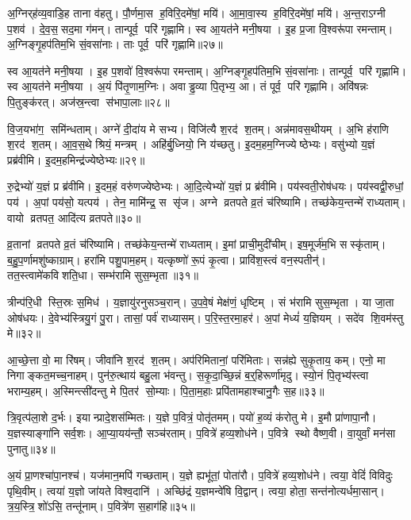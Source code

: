 अ॒ग्निर्‌ह॑व्य॒वाडि॒ह ताना व॑हतु।
पौ॒र्णमा॒स ह॒विरि॒दमे॑षां॒ मयि॑।
आ॒मा॒वा॒स्य ह॒विरि॒दमे॑षां॒ मयि॑।
अ॒न्त॒राऽग्नी प॒शव॑।
दे॒व॒स॒सद॒मा ग॑मन्।
तान्पूर्व॒ परि॑ गृह्णामि।
स्व आ॒यत॑ने मनी॒षया।
इ॒ह प्र॒जा वि॒श्वरू॑पा रमन्ताम्।
अ॒ग्निङ्गृ॒हप॑तिम॒भि सं॒वसा॑नाः।
ताः पूर्व॒ परि॑ गृह्णामि॥२७॥

स्व आ॒यत॑ने मनी॒षया।
इ॒ह प॒शवो॑ वि॒श्वरू॑पा रमन्ताम्।
अ॒ग्निङ्गृ॒हप॑तिम॒भि सं॒वसा॑नाः।
तान्पूर्व॒ परि॑ गृह्णामि।
स्व आ॒यत॑ने मनी॒षया।
अ॒यं पि॑तृ॒णाम॒ग्निः।
अवाड्ढ॒व्या पि॒तृभ्य॒ आ।
तं पूर्व॒ परि॑ गृह्णामि।
अवि॑षन्नः पि॒तुङ्क॑रत्।
अज॑स्र॒न्त्वा स॑भापा॒लाः॥२८॥

वि॒ज॒यभा॑ग॒ समि॑न्धताम्।
अग्ने॑ दी॒दा॑य मे सभ्य।
विजि॑त्यै श॒रद॑ श॒तम्।
अन्न॑मावस॒थीयम्।
अ॒भि ह॑राणि श॒रद॑ श॒तम्।
आ॒व॒स॒थे श्रियं॒ मन्त्रम्।
अहि॑र्बु॒ध्नियो॒ नि य॑च्छतु।
इ॒दम॒हम॒ग्निज्येष्ठेभ्यः।
वसु॑भ्यो य॒ज्ञं प्रब्र॑वीमि।
इ॒दम॒हमिन्द्र॑ज्येष्ठेभ्यः॥२९॥

रु॒द्रेभ्यो॑ य॒ज्ञं प्र ब्र॑वीमि।
इ॒दम॒हं वरु॑णज्येष्ठेभ्यः।
आ॒दि॒त्येभ्यो॑ य॒ज्ञं प्र ब्र॑वीमि।
पय॑स्वती॒रोष॑धयः।
पय॑स्वद्वी॒रुधां॒ पय॑।
अ॒पां पय॑सो॒ यत्पय॑।
तेन॒ मामि॑न्द्र॒ स सृ॑ज।
अग्ने व्रतपते व्र॒तं च॑रिष्यामि।
तच्छ॑केय॒न्तन्मे॑ राध्यताम्।
वायो व्रतपत॒ आदि॑त्य व्रतपते॥३०॥

व्र॒तानां व्रतपते व्र॒तं च॑रिष्यामि।
तच्छ॑केय॒न्तन्मे॑ राध्यताम्।
इ॒मां प्राची॒मुदी॑चीम्।
इष॒मूर्ज॑म॒भि सस्कृ॑ताम्।
ब॒हु॒प॒र्णामशु॑ष्काग्राम्।
हरा॑मि पशु॒पाम॒हम्।
यत्कृष्णो॑ रू॒पं कृ॒त्वा।
प्रावि॑श॒स्त्वं वन॒स्पतीन्॑।
तत॒स्त्वामे॑कविशति॒धा।
सम्भ॑रामि सुस॒म्भृता॥३१॥

त्रीन्प॑रि॒धी स्ति॒स्रः स॒मिध॑।
य॒ज्ञायु॑रनुसञ्च॒रान्।
उ॒प॒वे॒षं मेक्ष॑णं॒ धृष्टिम्।
सं भ॑रामि सुस॒म्भृता।
या जा॒ता ओष॑धयः।
दे॒वेभ्य॑स्त्रियु॒गं पु॒रा।
तासां॒ पर्व॑ राध्यासम्।
प॒रि॒स्त॒रमा॒हर\sn{}॑।
अ॒पां मेध्यं॑ य॒ज्ञियम्।
सदे॑व शि॒वम॑स्तु मे॥३२॥

आ॒च्छे॒त्ता वो॒ मा रि॑षम्।
जीवा॑नि श॒रद॑ श॒तम्।
अप॑रिमितानां॒ परि॑मिताः।
सन्न॑ह्ये सुकृ॒ताय॒ कम्।
एनो॒ मा निगाङ्कत॒मच्च॒नाहम्।
पुन॑रु॒त्थाय॑ बहु॒ला भ॑वन्तु।
स॒कृ॒दा॒च्छि॒न्नं ब॒र्॒हिरूर्णा॑मृदु।
स्यो॒नं पि॒तृभ्य॑स्त्वा भराम्य॒हम्।
अ॒स्मिन्त्सी॑दन्तु मे पि॒तर॑ सो॒म्याः।
पि॒ता॒म॒हाः प्रपि॑तामहाश्चानु॒गैः स॒ह॥३३॥

त्रि॒वृत्प॑ला॒शे द॒र्भः।
इयान्प्रादे॒शस॑म्मितः।
य॒ज्ञे प॒वित्रं॒ पोतृ॑तमम्।
पयो॑ ह॒व्यं क॑रोतु मे।
इ॒मौ प्रा॑णापा॒नौ।
य॒ज्ञस्याङ्गा॑नि सर्व॒शः।
आ॒प्या॒यय॑न्तौ॒ सञ्च॑रताम्।
प॒वित्रे॑ हव्य॒शोध॑ने।
प॒वित्रे स्थो वैष्ण॒वी।
वा॒युर्वां॒ मन॑सा पुनातु॥३४॥

अ॒यं प्रा॒णश्चा॑पा॒नश्च॑।
यज॑मान॒मपि॑ गच्छताम्।
य॒ज्ञे ह्यभू॑तां॒ पोता॑रौ।
प॒वित्रे॑ हव्य॒शोध॑ने।
त्वया॒ वेदिं॑ विविदुः पृथि॒वीम्।
त्वया॑ य॒ज्ञो जा॑यते विश्व॒दानि॑।
अच्छि॑द्रं य॒ज्ञमन्वे॑षि वि॒द्वान्।
त्वया॒ होता॒ सन्त॑नोत्यर्धमा॒सान्।
त्र॒य॒स्त्रि॒शो॑ऽसि॒ तन्तू॑नाम्।
प॒वित्रे॑ण स॒हाग॑हि॥३५॥

